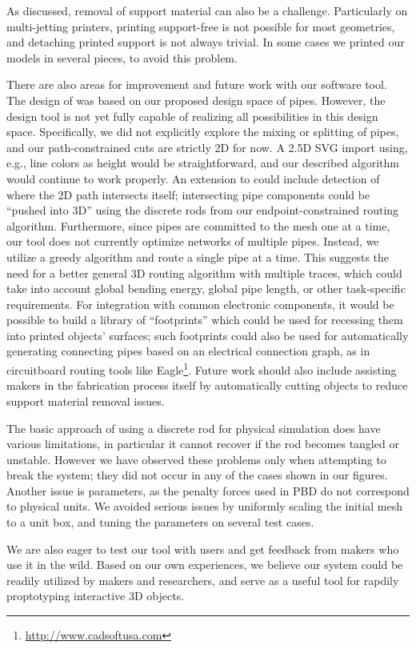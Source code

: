 As discussed, removal of support material can also be a challenge.  Particularly on multi-jetting printers, printing support-free is not possible for most geometries, and detaching printed support is not always trivial. In some cases we printed our models in several pieces, to avoid this problem. 

There are also areas for improvement and future work with our software tool.  The design of \systemname was based on our proposed design space of pipes.  However, the design tool is not yet fully capable of realizing all possibilities in this design space.  Specifically, we did not explicitly explore the mixing or splitting of pipes, and our path-constrained cuts are strictly 2D for now.  A 2.5D SVG import using, e.g., line colors as height would be straightforward, and our described algorithm would continue to work properly.  An extension to \systemname could include detection of where the 2D path intersects itself; intersecting pipe components could be ``pushed into 3D'' using the discrete rods from our endpoint-constrained routing algorithm.  Furthermore, since pipes are committed to the mesh one at a time, our tool does not currently optimize networks of multiple pipes. Instead, we utilize a greedy algorithm and route a single pipe at a time.  This suggests the need for a better general 3D routing algorithm with multiple traces, which could take into account global bending energy, global pipe length, or other task-specific requirements.  For integration with common electronic components, it would be possible to build a library of ``footprints'' which could be used for recessing them into printed objects' surfaces; such footprints could also be used for automatically generating connecting pipes based on an electrical connection graph, as in circuitboard routing tools like Eagle\footnote{\url{http://www.cadsoftusa.com}}.  Future work should also include assisting makers in the fabrication process itself by automatically cutting objects to reduce support material removal issues. %

The basic approach of using a discrete rod for physical simulation does have various limitations, in particular it
cannot recover if the rod becomes tangled or unstable. 
However we have observed these problems only when attempting to break
the system; they did not occur in any of the cases shown in our figures.
Another issue is parameters, as the penalty forces used in PBD do not
correspond to physical units. We avoided serious issues by uniformly
scaling the initial mesh to a unit box, and tuning the parameters on several test cases.

We are also eager to test our tool with users and get feedback from makers who use it in the wild. Based on our own experiences, we believe our system could be readily utilized by makers and researchers, and serve as a useful tool for rapdily proptotyping interactive 3D objects.
